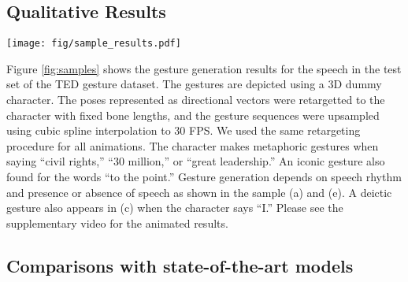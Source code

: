 \documentclass[acmtog]{acmart}
\begin{document}
\subsection{Qualitative Results}

\begin{figure*}
  \centering
  \texttt{[image: fig/sample\_results.pdf]}
  \caption{Sample results of co-speech gesture generation from the trimodal speech context of text, audio, and speaker identity. Motion history images for some parts are depicted along with the speech text and audio signals. In (a), the character makes metaphoric gestures when saying ``civil rights'' and beat gestures for ``cities and states.'' In (b) and (d), there are metaphoric gestures for the words of ``30 million,'' ``great leadership,'' and ``giving up.'' In (c), a deictic gesture appears when the character says ``I.'' In (e), we can find the character does not gesture in the middle of the silence. An iconic gesture is also found in (f).}
  \label{fig:samples}
\end{figure*}

Figure \ref{fig:samples} shows the gesture generation results for the speech in the test set of the TED gesture dataset. The gestures are depicted using a 3D dummy character. The poses represented as directional vectors were retargetted to the character with fixed bone lengths, and the gesture sequences were upsampled using cubic spline interpolation to 30 FPS. We used the same retargeting procedure for all animations. The character makes metaphoric gestures when saying ``civil rights,'' ``30 million,'' or ``great leadership.'' An iconic gesture also found for the words ``to the point.'' Gesture generation depends on speech rhythm and presence or absence of speech as shown in the sample (a) and (e). A deictic gesture also appears in (c) when the character says ``I.'' Please see the supplementary video for the animated results.

\subsection{Comparisons with state-of-the-art models} \label{sec:sota}
\end{document}
